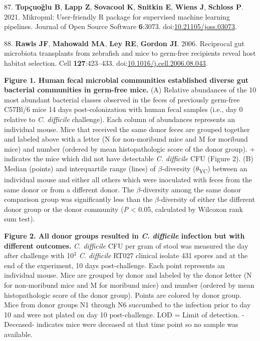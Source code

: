 \documentclass[
  12pt,
]{article}
\newenvironment{cslreferences}%
  {}%
  {\par}
\begin{document}
\begin{cslreferences}
\leavevmode\hypertarget{ref-Topcuoglu2021}{}%
87. \textbf{Topçuoğlu B}, \textbf{Lapp Z}, \textbf{Sovacool K},
\textbf{Snitkin E}, \textbf{Wiens J}, \textbf{Schloss P}. 2021.
Mikropml: User-friendly R package for supervised machine learning
pipelines. Journal of Open Source Software \textbf{6}:3073.
doi:\href{https://doi.org/10.21105/joss.03073}{10.21105/joss.03073}.

\leavevmode\hypertarget{ref-Rawls2006}{}%
88. \textbf{Rawls JF}, \textbf{Mahowald MA}, \textbf{Ley RE},
\textbf{Gordon JI}. 2006. Reciprocal gut microbiota transplants from
zebrafish and mice to germ-free recipients reveal host habitat
selection. Cell \textbf{127}:423--433.
doi:\href{https://doi.org/10.1016/j.cell.2006.08.043}{10.1016/j.cell.2006.08.043}.
\end{cslreferences}

\newpage

\textbf{Figure 1. Human fecal microbial communities established diverse
gut bacterial communities in germ-free mice.} (A) Relative abundances of
the 10 most abundant bacterial classes observed in the feces of
previously germ-free C57Bl/6 mice 14 days post-colonization with human
fecal samples (i.e., day 0 relative to \emph{C. difficile} challenge).
Each column of abundances represents an individual mouse. Mice that
received the same donor feces are grouped together and labeled above
with a letter (N for non-moribund mice and M for moribund mice) and
number (ordered by mean histopathologic score of the donor group). +
indicates the mice which did not have detectable \emph{C. difficile} CFU
(Figure 2). (B) Median (points) and interquartile range (lines) of
\(\beta\)-diversity (\(\theta\)\textsubscript{YC}) between an individual
mouse and either all others which were inoculated with feces from the
same donor or from a different donor. The \(\beta\)-diversity among the
same donor comparison group was significantly less than the
\(\beta\)-diversity of either the different donor group or the donor
community (\emph{P} \textless{} 0.05, calculated by Wilcoxon rank sum
test).

\hfill\break

\textbf{Figure 2. All donor groups resulted in \emph{C. difficile}
infection but with different outcomes.} \emph{C. difficile} CFU per gram
of stool was measured the day after challenge with 10\(^{3}\) \emph{C.
difficile} RT027 clinical isolate 431 spores and at the end of the
experiment, 10 days post-challenge. Each point represents an individual
mouse. Mice are grouped by donor and labeled by the donor letter (N for
non-moribund mice and M for moribund mice) and number (ordered by mean
histopathologic score of the donor group). Points are colored by donor
group. Mice from donor groups N1 through N6 succumbed to the infection
prior to day 10 and were not plated on day 10 post-challenge. LOD =
Limit of detection. -Deceased- indicates mice were deceased at that time
point so no sample was available.
\end{document}
